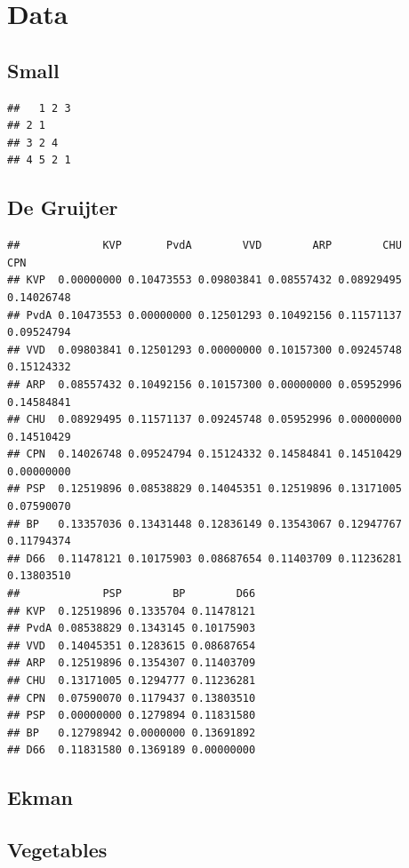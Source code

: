 \documentclass[
  12pt,
]{book}
\theoremstyle{definition}
\theoremstyle{definition}
\theoremstyle{definition}
\theoremstyle{definition}
\theoremstyle{remark}
\begin{document}
\hypertarget{apdatasets}{%
\chapter{Data}\label{apdatasets}}

\hypertarget{apdatadsmall}{%
\section{Small}\label{apdatadsmall}}

\begin{verbatim}
##   1 2 3
## 2 1    
## 3 2 4  
## 4 5 2 1
\end{verbatim}

\hypertarget{apdatagruijter}{%
\section{De Gruijter}\label{apdatagruijter}}

\begin{verbatim}
##             KVP       PvdA        VVD        ARP        CHU        CPN
## KVP  0.00000000 0.10473553 0.09803841 0.08557432 0.08929495 0.14026748
## PvdA 0.10473553 0.00000000 0.12501293 0.10492156 0.11571137 0.09524794
## VVD  0.09803841 0.12501293 0.00000000 0.10157300 0.09245748 0.15124332
## ARP  0.08557432 0.10492156 0.10157300 0.00000000 0.05952996 0.14584841
## CHU  0.08929495 0.11571137 0.09245748 0.05952996 0.00000000 0.14510429
## CPN  0.14026748 0.09524794 0.15124332 0.14584841 0.14510429 0.00000000
## PSP  0.12519896 0.08538829 0.14045351 0.12519896 0.13171005 0.07590070
## BP   0.13357036 0.13431448 0.12836149 0.13543067 0.12947767 0.11794374
## D66  0.11478121 0.10175903 0.08687654 0.11403709 0.11236281 0.13803510
##             PSP        BP        D66
## KVP  0.12519896 0.1335704 0.11478121
## PvdA 0.08538829 0.1343145 0.10175903
## VVD  0.14045351 0.1283615 0.08687654
## ARP  0.12519896 0.1354307 0.11403709
## CHU  0.13171005 0.1294777 0.11236281
## CPN  0.07590070 0.1179437 0.13803510
## PSP  0.00000000 0.1279894 0.11831580
## BP   0.12798942 0.0000000 0.13691892
## D66  0.11831580 0.1369189 0.00000000
\end{verbatim}

\hypertarget{apdataekman}{%
\section{Ekman}\label{apdataekman}}

\hypertarget{apdataveg}{%
\section{Vegetables}\label{apdataveg}}
\end{document}
